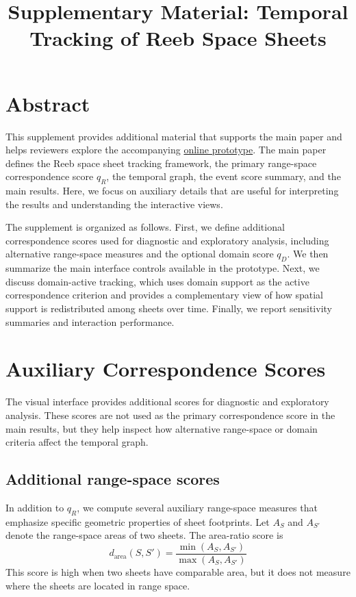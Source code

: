 \documentclass[review]{vgtc}
\title{Supplementary Material: Temporal Tracking of Reeb Space Sheets}
\newcommand{\Sheet}{S}
\begin{document}
\maketitle

\section{Abstract}

This supplement provides additional material that supports the main paper and helps reviewers explore the accompanying \href{https://reebflowvisualizer.github.io}{online prototype}. The main paper defines the Reeb space sheet tracking framework, the primary range-space correspondence score $q_R$, the temporal graph, the event score summary, and the main results. Here, we focus on auxiliary details that are useful for interpreting the results and understanding the interactive views.

The supplement is organized as follows. First, we define additional correspondence scores used for diagnostic and exploratory analysis, including alternative range-space measures and the optional domain score $q_D$. We then summarize the main interface controls available in the prototype. Next, we discuss domain-active tracking, which uses domain support as the active correspondence criterion and provides a complementary view of how spatial support is redistributed among sheets over time. Finally, we report sensitivity summaries and interaction performance.

\section{Auxiliary Correspondence Scores}
The visual interface provides additional scores for diagnostic and exploratory analysis. These scores are not used as the primary correspondence score in the main results, but they help inspect how alternative range-space or domain criteria affect the temporal graph.


\subsection{Additional range-space scores}

In addition to $q_R$, we compute several auxiliary range-space measures that emphasize specific geometric properties of sheet footprints. Let $A_\Sheet$ and $A_{\Sheet'}$ denote the range-space areas of two sheets. The area-ratio score is
$$
d_\mathrm{area}(\Sheet,\Sheet') =
\frac{\min(A_\Sheet,A_{\Sheet'})}
{\max(A_\Sheet,A_{\Sheet'})}
$$
This score is high when two sheets have comparable area, but it does not measure where the sheets are located in range space.
\end{document}
